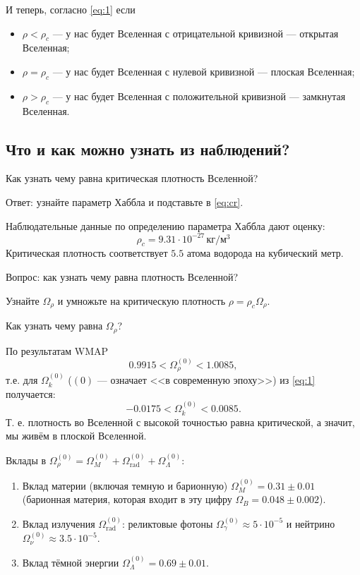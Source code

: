 \documentclass[]{article}
\begin{document}
И теперь, согласно \eqref{eq:1}  если
\begin{itemize}
	\item $\rho < \rho_c$ --- у нас будет Вселенная с отрицательной кривизной --- открытая Вселенная;
	\item $\rho = \rho_c$ --- у нас будет Вселенная с нулевой кривизной --- плоская Вселенная;
	\item $\rho > \rho_c$ --- у нас будет Вселенная с положительной кривизной --- замкнутая Вселенная.
\end{itemize}


\subsection{Что и как можно узнать из наблюдений?}

\begin{tcolorbox}
	Как узнать чему равна критическая плотность Вселенной?
\end{tcolorbox}
Ответ: узнайте параметр Хаббла и подставьте в \eqref{eq:cr}.

Наблюдательные данные по определению параметра Хаббла дают оценку:
\[
	\rho_c = 9.31\cdot 10^{-27}
	\, \text{кг/м${}^3$}
\]
Критическая плотность соответствует $5.5$ атома водорода на кубический метр.


\begin{tcolorbox}
	Вопрос: как узнать чему равна плотность Вселенной?
\end{tcolorbox}

Узнайте $\Omega_{\rho}$ и умножьте на критическую плотность $\rho = \rho_c \Omega_{\rho}$.

\begin{tcolorbox}
	Как узнать чему равна $\Omega_{\rho}$?
\end{tcolorbox}

По результатам WMAP
\begin{equation}\label{}
	0.9915 < \Omega_{\rho}^{(0)} <  1.0085,
\end{equation}
т.е. для $\Omega_{k}^{(0)}$ ($(0)$ --- означает <<в современную эпоху>>) из \eqref{eq:1} получается:
\begin{equation}\label{}
	-0.0175 < \Omega_{k}^{(0)} <  0.0085.
\end{equation}
Т. е. плотность во Вселенной с высокой точностью равна критической, а значит, мы живём в плоской Вселенной.

\bigskip

Вклады в $\Omega_{\rho}^{(0)} = \Omega_{M}^{(0)} + \Omega_\text{rad}^{(0)} + \Omega_{\Lambda}^{(0)} $:
\begin{enumerate}
	\item Вклад материи (включая темную и барионную) $\Omega_{M}^{(0)} = 0.31 \pm 0.01$ (барионная материя, которая входит в эту цифру $\Omega_B = 0.048 \pm 0.002$).
	\item Вклад излучения $\Omega_\text{rad}^{(0)}$: реликтовые фотоны $\Omega_{\gamma}^{(0)} \approx 5\cdot 10^{-5}$ и нейтрино $\Omega_{\nu}^{(0)} \approx 3.5\cdot 10^{-5}$.
	\item Вклад тёмной энергии $\Omega_{\Lambda}^{(0)} = 0.69 \pm 0.01$.
\end{enumerate}
\end{document}

